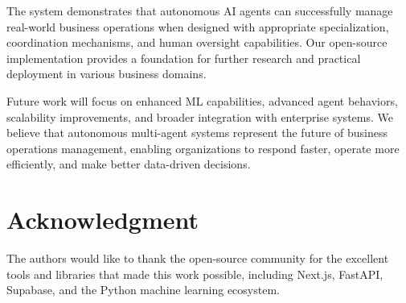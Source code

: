 \documentclass[conference]{IEEEtran}
\begin{document}
The system demonstrates that autonomous AI agents can successfully manage real-world business operations when designed with appropriate specialization, coordination mechanisms, and human oversight capabilities. Our open-source implementation provides a foundation for further research and practical deployment in various business domains.

Future work will focus on enhanced ML capabilities, advanced agent behaviors, scalability improvements, and broader integration with enterprise systems. We believe that autonomous multi-agent systems represent the future of business operations management, enabling organizations to respond faster, operate more efficiently, and make better data-driven decisions.

\section*{Acknowledgment}
The authors would like to thank the open-source community for the excellent tools and libraries that made this work possible, including Next.js, FastAPI, Supabase, and the Python machine learning ecosystem.
\end{document}

